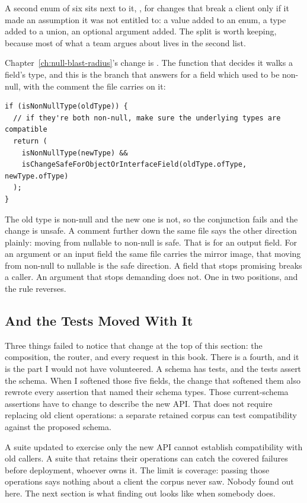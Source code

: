 %
A second enum of six sits next to it, , for changes
that break a client only if it made an assumption it was not entitled to: a
value added to an enum, a type added to a union, an optional argument added.
The split is worth keeping, because most of what a team argues about lives in
the second list.

%
Chapter~\ref{ch:null-blast-radius}'s change is .
The function that decides it walks a field's type, and this is the branch that
answers for a field which used to be non-null, with the comment the file
carries on it:

\begin{verbatim}
if (isNonNullType(oldType)) {
  // if they're both non-null, make sure the underlying types are compatible
  return (
    isNonNullType(newType) &&
    isChangeSafeForObjectOrInterfaceField(oldType.ofType, newType.ofType)
  );
}
\end{verbatim}

%
The old type is non-null and the new one is not, so the conjunction fails and
the change is unsafe. A comment further down the same file says the other
direction plainly: moving from nullable to non-null is safe. That is for an
output field. For an argument or an input field the same file carries the
mirror image, that moving from non-null to nullable is the safe direction. A
field that stops promising breaks a caller. An argument that stops demanding
does not. One \code{!} in two positions, and the rule reverses.

\subsection{And the Tests Moved With It}

%
Three things failed to notice that change at the top of this section: the
composition, the router, and every request in this book. There is a fourth,
and it is the part I would not have volunteered. A schema has tests, and the
tests assert the schema. When I softened those five fields, the change that
softened them also rewrote every assertion that named their schema types.
Those current-schema assertions have to change to describe the new API.
That does not require replacing old client operations: a separate retained
corpus can test compatibility against the proposed schema.

%
A suite updated to exercise only the new API cannot establish compatibility
with old callers. A suite that retains their operations can catch the
covered failures before deployment, whoever owns it. The limit is coverage:
passing those operations says nothing about a client the corpus never saw.
Nobody found out here. The next section is what finding out looks like when
somebody does.
%
